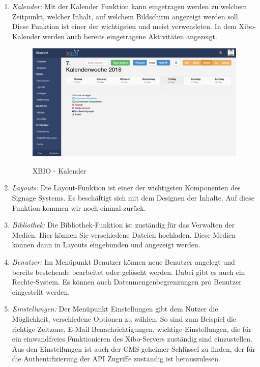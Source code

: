 \begin{enumerate}
	\item {\em Kalender:} Mit der Kalender Funktion kann eingetragen werden zu welchem Zeitpunkt, welcher Inhalt, auf welchem Bildschirm angezeigt werden soll. Diese Funktion ist einer der wichtigsten und meist verwendeten. In dem Xibo-Kalender werden auch bereits eingetragene Aktivitäten angezeigt.

\begin{figure}[H]
	\centering
\includegraphics[width=1\textwidth]{images/xibo-basics-calendar}
	\label{img:calendar}
	\caption{XBIO - Kalender}
\end{figure}	
	
	\item {\em Layouts:} 
	Die Layout-Funktion ist einer der wichtigsten Komponenten des Signage Systems. Es beschäftigt sich mit dem Designen der Inhalte. Auf diese Funktion kommen wir noch einmal zurück.
	
	\item {\em Bibliothek:} 
	Die Bibliothek-Funktion ist zuständig für das Verwalten der Medien. Hier können Sie verschiedene Dateien hochladen.  Diese Medien können dann in Layouts eingebunden und angezeigt werden.
	
	\item {\em Benutzer:} 
	Im Menüpunkt Benutzer können neue Benutzer angelegt und bereits bestehende bearbeitet oder gelöscht werden. Dabei gibt es auch ein Rechte-System. Es können auch Datenmengenbegrenzungen pro Benutzer eingestellt werden.
	
	\item {\em Einstellungen:} 
	Der Menüpunkt Einstellungen gibt dem Nutzer die Möglichkeit, verschiedene Optionen zu wählen. So sind zum Beispiel die richtige Zeitzone, E-Mail Benachrichtigungen, wichtige Einstellungen, die für ein einwandfreies Funktionieren des Xibo-Servers zuständig sind einzustellen. Aus den Einstellungen ist auch der CMS geheimer Schlüssel zu finden, der für die Authentifizierung der API Zugriffe zuständig ist herauszulesen.
\end{enumerate}

